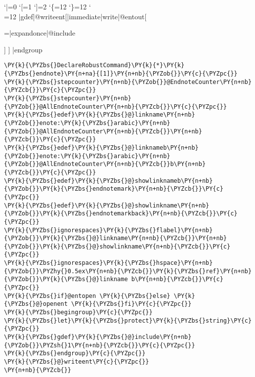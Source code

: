 \begingroup \catcode `|=0 \catcode `[=1
\catcode`]=2 \catcode `\{=12 \catcode `\}=12
\catcode`\\=12
|gdef|@writeent[|immediate|write|@entout[
{\footnotesize
\hspace{-2\parindent}
\leftskip=\parindent   |expandonce|@include \par } ] ]%
|endgroup

\begin{Verbatim}[commandchars=\\\{\}]
\PY{k}{\PYZbs{}DeclareRobustCommand}\PY{k}{*}\PY{k}{\PYZbs{}endnote}\PY{n+na}{[1]}\PY{n+nb}{\PYZob{}}\PY{c}{\PYZpc{}}
\PY{k}{\PYZbs{}stepcounter}\PY{n+nb}{\PYZob{}}@EndnoteCounter\PY{n+nb}{\PYZcb{}}\PY{c}{\PYZpc{}}
\PY{k}{\PYZbs{}stepcounter}\PY{n+nb}{\PYZob{}}@AllEndnoteCounter\PY{n+nb}{\PYZcb{}}\PY{c}{\PYZpc{}}
\PY{k}{\PYZbs{}edef}\PY{k}{\PYZbs{}@}linkname\PY{n+nb}{\PYZob{}}enote:\PY{k}{\PYZbs{}arabic}\PY{n+nb}{\PYZob{}}@AllEndnoteCounter\PY{n+nb}{\PYZcb{}}\PY{n+nb}{\PYZcb{}}\PY{c}{\PYZpc{}}
\PY{k}{\PYZbs{}edef}\PY{k}{\PYZbs{}@}linknameb\PY{n+nb}{\PYZob{}}enote:\PY{k}{\PYZbs{}arabic}\PY{n+nb}{\PYZob{}}@AllEndnoteCounter\PY{n+nb}{\PYZcb{}}b\PY{n+nb}{\PYZcb{}}\PY{c}{\PYZpc{}}
\PY{k}{\PYZbs{}edef}\PY{k}{\PYZbs{}@}showlinknameb\PY{n+nb}{\PYZob{}}\PY{k}{\PYZbs{}endnotemark}\PY{n+nb}{\PYZcb{}}\PY{c}{\PYZpc{}}
\PY{k}{\PYZbs{}edef}\PY{k}{\PYZbs{}@}showlinkname\PY{n+nb}{\PYZob{}}\PY{k}{\PYZbs{}endnotemarkback}\PY{n+nb}{\PYZcb{}}\PY{c}{\PYZpc{}}
\PY{k}{\PYZbs{}ignorespaces}\PY{k}{\PYZbs{}flabel}\PY{n+nb}{\PYZob{}}\PY{k}{\PYZbs{}@}linkname\PY{n+nb}{\PYZcb{}}\PY{n+nb}{\PYZob{}}\PY{k}{\PYZbs{}@}showlinkname\PY{n+nb}{\PYZcb{}}\PY{c}{\PYZpc{}}
\PY{k}{\PYZbs{}ignorespaces}\PY{k}{\PYZbs{}hspace}\PY{n+nb}{\PYZob{}}\PYZhy{}0.5ex\PY{n+nb}{\PYZcb{}}\PY{k}{\PYZbs{}ref}\PY{n+nb}{\PYZob{}}\PY{k}{\PYZbs{}@}linkname b\PY{n+nb}{\PYZcb{}}\PY{c}{\PYZpc{}}
\PY{k}{\PYZbs{}if}@entopen \PY{k}{\PYZbs{}else} \PY{k}{\PYZbs{}@}openent \PY{k}{\PYZbs{}fi}\PY{c}{\PYZpc{}}
\PY{k}{\PYZbs{}begingroup}\PY{c}{\PYZpc{}}
\PY{k}{\PYZbs{}let}\PY{k}{\PYZbs{}protect}\PY{k}{\PYZbs{}string}\PY{c}{\PYZpc{}}
\PY{k}{\PYZbs{}gdef}\PY{k}{\PYZbs{}@}include\PY{n+nb}{\PYZob{}}\PYZsh{}1\PY{n+nb}{\PYZcb{}}\PY{c}{\PYZpc{}}
\PY{k}{\PYZbs{}endgroup}\PY{c}{\PYZpc{}}
\PY{k}{\PYZbs{}@}writeent\PY{c}{\PYZpc{}}
\PY{n+nb}{\PYZcb{}}
\end{Verbatim}

\DeclareRobustCommand*\endnote[1]{%
\stepcounter{@EndnoteCounter}%
\stepcounter{@AllEndnoteCounter}%
\edef\@linkname{enote:\arabic{@AllEndnoteCounter}}%
\edef\@linknameb{enote:\arabic{@AllEndnoteCounter}b}%
\edef\@showlinknameb{\endnotemark}%
\edef\@showlinkname{\endnotemarkback}%
\ignorespaces\flabel{\@linkname}{\@showlinkname}%
\ignorespaces\hspace{-0.5ex}\ref{\@linkname b}%
\if@entopen \else \@openent \fi%
\begingroup%
\let\protect\string%
\gdef\@include{#1}%
\endgroup%
\@writeent%
}

